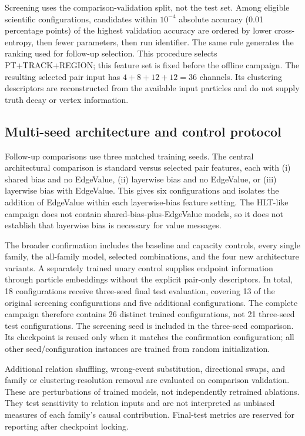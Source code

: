 Screening uses the comparison-validation split, not the test set. Among
eligible scientific configurations, candidates within $10^{-4}$ absolute
accuracy (0.01 percentage points) of the highest validation accuracy are
ordered by lower cross-entropy, then fewer parameters, then run identifier.
The same rule generates the ranking used for follow-up selection. This
procedure selects PT+TRACK+REGION; this feature set is fixed before the
offline campaign. The resulting selected pair input has
$4+8+12+12=36$ channels. Its clustering descriptors are reconstructed from
the available input particles and do not supply truth decay or vertex
information.

\subsection{Multi-seed architecture and control protocol}
\label{sec:hlt-confirmation}

Follow-up comparisons use three matched training seeds. The central architectural
comparison is standard versus selected pair features, each with (i) shared
bias and no EdgeValue, (ii) layerwise bias and no EdgeValue, or (iii)
layerwise bias with EdgeValue. This gives six configurations and isolates
the addition of EdgeValue within each layerwise-bias feature setting. The
HLT-like campaign does not contain shared-bias-plus-EdgeValue models, so it
does not establish that layerwise bias is necessary for value messages.

The broader confirmation includes the baseline and capacity controls, every
single family, the all-family model, selected combinations, and the four
new architecture variants. A separately trained unary control supplies
endpoint information through particle embeddings without the explicit
pair-only descriptors. In total, 18 configurations receive three-seed final
test evaluation, covering 13 of the original screening configurations and
five additional configurations. The complete campaign therefore contains
26 distinct trained configurations, not 21 three-seed test configurations.
The screening seed is included in the three-seed comparison. Its checkpoint
is reused only when it matches the confirmation configuration; all other
seed/configuration instances are trained from random initialization.

Additional relation shuffling, wrong-event substitution, directional swaps,
and family or clustering-resolution removal are evaluated on comparison
validation. These are perturbations of trained models, not independently
retrained ablations. They test sensitivity to relation inputs and are not
interpreted as unbiased measures of each family's causal contribution.
Final-test metrics are reserved for reporting after checkpoint locking.


